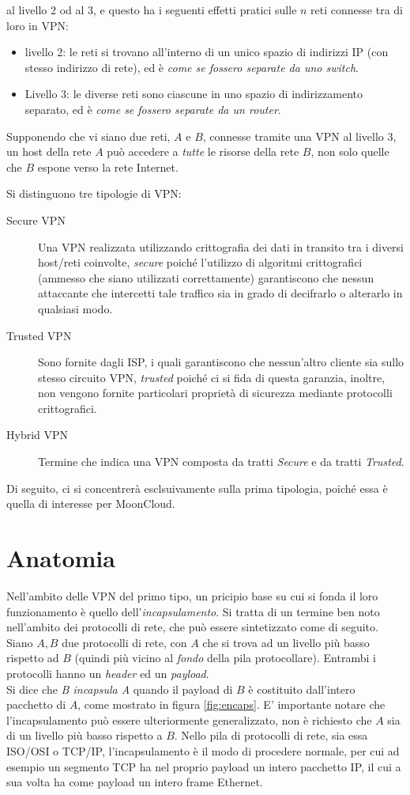 al livello 2 od al 3, e questo ha i seguenti effetti pratici sulle $n$ reti connesse
tra di loro in VPN:
\begin{itemize}
  \item livello 2: le reti si trovano all'interno di un unico spazio di indirizzi IP
  (con stesso indirizzo di rete), ed è \textit{come se fossero separate da uno switch}.
  \item Livello 3: le diverse reti sono ciascune in uno spazio di indirizzamento separato,
  ed è \textit{come se fossero separate da un router}.
\end{itemize}
Supponendo che vi siano due reti, $A$ e $B$, connesse tramite una VPN al livello 3,
un host della rete $A$ può accedere a \textit{tutte} le risorse della rete $B$,
non solo quelle che $B$ espone verso la rete Internet.


Si distinguono tre tipologie di VPN:
\begin{description}
  \item[Secure VPN]Una VPN realizzata utilizzando crittografia dei dati in transito
  tra i diversi host/reti coinvolte, \textit{secure} poiché l'utilizzo di algoritmi
  crittografici (ammesso che siano utilizzati correttamente) garantiscono che nessun
  attaccante che intercetti tale traffico sia in grado di decifrarlo o alterarlo in
  qualsiasi modo.
  \item[Trusted VPN]Sono fornite dagli ISP, i quali garantiscono che nessun'altro
  cliente sia sullo stesso circuito VPN, \textit{trusted} poiché ci si fida di
  questa garanzia, inoltre, non vengono fornite particolari proprietà di sicurezza
  mediante protocolli crittografici.
  \item[Hybrid VPN]Termine che indica una VPN composta da tratti \textit{Secure}
  e da tratti \textit{Trusted}.
\end{description}
Di seguito, ci si concentrerà esclsuivamente sulla prima tipologia, poiché essa è
quella di interesse per MoonCloud.


\section{Anatomia}
Nell'ambito delle VPN del primo tipo, un pricipio base su cui si fonda il loro
funzionamento è quello dell'\textit{incapsulamento}. Si tratta di un termine
ben noto nell'ambito dei protocolli di rete, che può essere sintetizzato come
di seguito. Siano $A, B$ due protocolli di rete, con $A$ che si trova ad un livello
più basso rispetto ad $B$ (quindi più vicino al \textit{fondo} della pila
protocollare). Entrambi i protocolli hanno un \textit{header} ed un
\textit{payload}.\\
Si dice che \textit{B incapsula A} quando il payload di $B$ è costituito dall'intero
pacchetto di $A$, come mostrato in figura \ref{fig:encaps}.
E' importante notare che l'incapsulamento può essere ulteriormente generalizzato,
non è richiesto che $A$ sia di un livello più basso rispetto a $B$. Nello pila
di protocolli di rete, sia essa ISO/OSI o TCP/IP, l'incapsulamento è il modo di
procedere normale, per cui ad esempio un segmento TCP ha nel proprio payload
un intero pacchetto IP, il cui a sua volta ha come payload un intero frame Ethernet.


